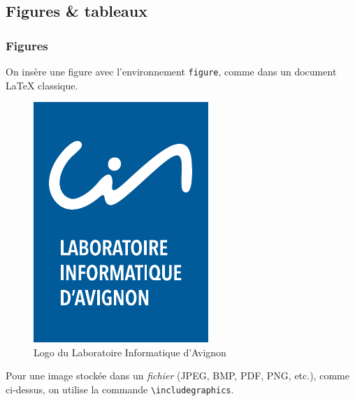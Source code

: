 \documentclass[10pt,    %
    french,             %
    xcolor=table,       %
    envcountsect,       %
    aspectratio=43      %
]{beamer}
\begin{document}
\subsection{Figures \& tableaux}
\begin{frame}
    \frametitle{Figures}
    
    On insère une figure avec l'environnement \texttt{figure}, comme dans un document \LaTeX{} classique.
    
    \begin{figure}[H]
        \centering
        \includegraphics[scale=0.5]{images/lia_logo.pdf}
        \caption{Logo du Laboratoire Informatique d'Avignon}
        \label{fig:LIAlogo}
    \end{figure}
    
    Pour une image stockée dans un \textit{fichier} (JPEG, BMP, PDF, PNG, etc.), comme ci-dessus, on utilise la commande \texttt{\textbackslash{}includegraphics}.
    
    
    

\end{frame}
\end{document}
